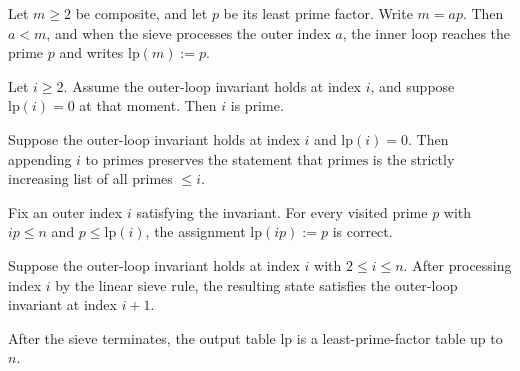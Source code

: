 \begin{lemma}
    \label{lem:composite_generated_early}
    Let $m\ge 2$ be composite, and let $p$ be its least prime factor.
    Write $m = ap$.
    Then $a < m$, and when the sieve processes the outer index $a$, the inner loop reaches the prime $p$ and writes $\mathrm{lp}(m):=p$.
\end{lemma}

\begin{lemma}[If $\mathrm{lp}(i)=0$, then $i$ is prime]
    \label{lem:lp_zero_implies_prime}
    Let $i\ge 2$.
    Assume the outer-loop invariant holds at index $i$, and suppose $\mathrm{lp}(i)=0$ at that moment.
    Then $i$ is prime.
\end{lemma}

\begin{lemma}
    \label{lem:append_prime_preserves_prime_list}
    Suppose the outer-loop invariant holds at index $i$ and $\mathrm{lp}(i)=0$.
    Then appending $i$ to $\mathrm{primes}$ preserves the statement that $\mathrm{primes}$ is the strictly increasing list of all primes $\le i$.
\end{lemma}

\begin{lemma}
    \label{lem:inner_loop_correct}
    Fix an outer index $i$ satisfying the invariant.
    For every visited prime $p$ with $ip\le n$ and $p\le \mathrm{lp}(i)$, the assignment $\mathrm{lp}(ip):=p$ is correct.
\end{lemma}

\begin{lemma}
    \label{lem:outer_invariant_step}
    Suppose the outer-loop invariant holds at index $i$ with $2\le i\le n$.
    After processing index $i$ by the linear sieve rule, the resulting state satisfies the outer-loop invariant at index $i+1$.
\end{lemma}

\begin{theorem}
    \label{thm:lpf_correct}
    After the sieve terminates, the output table $\mathrm{lp}$ is a least-prime-factor table up to $n$.
\end{theorem}

